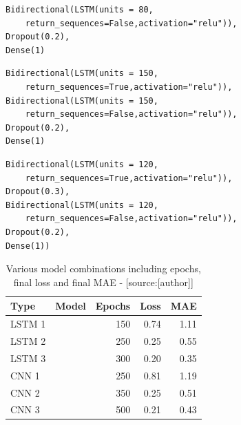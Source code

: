 \begin{lrbox}{\codebox} %
\begin{lstlisting}[numbers=none, basicstyle=\tiny, numbersep=0pt, xleftmargin=0pt, xrightmargin=0pt, backgroundcolor=\color{white}]
Bidirectional(LSTM(units = 80,
 	return_sequences=False,activation="relu")),
Dropout(0.2),
Dense(1)
\end{lstlisting}
\end{lrbox} %


\begin{lrbox}{\codeboxtwo} %
\begin{lstlisting}[numbers=none, basicstyle=\tiny, numbersep=0pt, xleftmargin=0pt, xrightmargin=0pt, backgroundcolor=\color{white}]
Bidirectional(LSTM(units = 150,
	return_sequences=True,activation="relu")),
Bidirectional(LSTM(units = 150,
	return_sequences=False,activation="relu")),
Dropout(0.2),
Dense(1)
\end{lstlisting}
\end{lrbox} %

\begin{lrbox}{\codeboxthree} %
\begin{lstlisting}[numbers=none, basicstyle=\tiny, numbersep=0pt, xleftmargin=0pt, xrightmargin=0pt, backgroundcolor=\color{white}]
Bidirectional(LSTM(units = 120, 
	return_sequences=True,activation="relu")),
Dropout(0.3),
Bidirectional(LSTM(units = 120, 
	return_sequences=False,activation="relu")),
Dropout(0.2),
Dense(1))
\end{lstlisting}
\end{lrbox} %

\begin{table}[H]
\begin{tabular}{|l|p{9cm}|r|r|r|}
  \hline
  \textbf{Type} & \textbf{Model} & \textbf{Epochs} & \textbf{Loss} & \textbf{MAE} \\
  \hline
  LSTM 1& \usebox{\codebox} & 150 & 0.74 & 1.11 \\
  \hline
  LSTM 2& \usebox{\codeboxtwo} & 250 & 0.25 & 0.55 \\
  \hline
  LSTM 3& \usebox{\codeboxtwo} & 300 & 0.20 & 0.35 \\
  \hline
    CNN 1 & \usebox{\codeboxfour} & 250 & 0.81 & 1.19 \\
  \hline
   CNN 2& \usebox{\codeboxfive} & 350 & 0.25 & 0.51 \\
  \hline
   CNN 3& \usebox{\codeboxsix} & 500 & 0.21 & 0.43 \\
  \hline
\end{tabular}
\caption{Various model combinations including epochs, final loss and final MAE - [source:[author]]}
	\label{tab:models}
\end{table}

